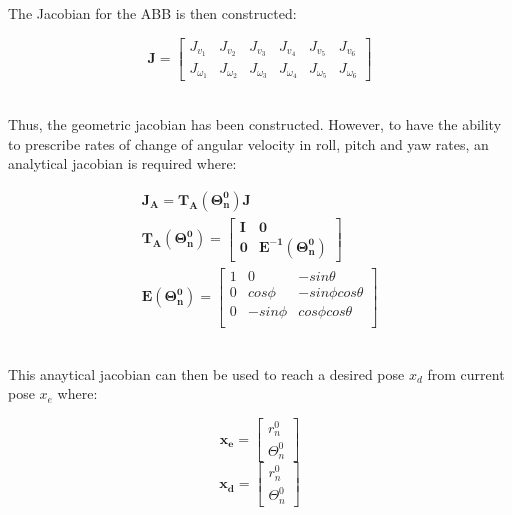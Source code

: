 \documentclass{UoNMCHA}
\numberwithin{equation}{section}
\begin{document}
The Jacobian for the ABB is then constructed:

\begin{equation*}
\mathbf{J} =
\begin{bmatrix}
J_{v_1} & J_{v_2} & J_{v_3} & J_{v_4} & J_{v_5} & J_{v_6}  \\
 J_{\omega_1} & J_{\omega_2} & J_{\omega_3} & J_{\omega_4} & J_{\omega_5} & J_{\omega_6}  
\end{bmatrix}
\end{equation*}\

Thus, the geometric jacobian has been constructed. However, to have the ability to prescribe rates of change of angular velocity in roll, pitch and yaw rates, an analytical jacobian is required where:\

\begin{equation*}
\begin{split}
\mathbf{J_A} = \mathbf{T_A (\Theta^0_n)J} \\
\mathbf{T_A (\Theta^0_n)} =
\begin{bmatrix}
\mathbf{I} & \mathbf{0} \\
\mathbf{0} & \mathbf{E^{-1}(\Theta^0_n)} 
\end{bmatrix} \\
\mathbf{E (\Theta^0_n)} =
\begin{bmatrix}
1 & 0 & -sin\theta\\
0 & cos\phi & -sin\phi cos\theta\\
0 & -sin\phi & cos\phi cos\theta\\
\end{bmatrix}
\end{split}
\end{equation*}\

This anaytical jacobian can then be used to reach a desired pose $x_d$ from current pose $x_e$ where:

\begin{multicols}{2}
	\begin{equation*}
	\mathbf{x_e} =
	\begin{bmatrix}
	r^0_{n} \\
	\Theta^0_{n} 
	\end{bmatrix}
	\end{equation*}\break
	\begin{equation*}
	\mathbf{x_d} =
	\begin{bmatrix}
	r^{0 }_{n} \\
	\Theta^{0 }_{n} 
	\end{bmatrix}
	\end{equation*}\	
\end{multicols}
\end{document}
